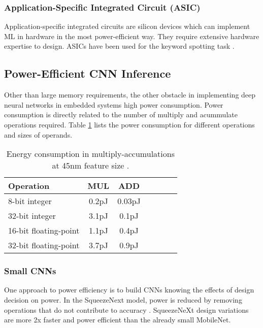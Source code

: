 \subsubsection{Application-Specific Integrated Circuit (ASIC)}

Application-specific integrated circuits are silicon devices which can implement ML in hardware in the most power-efficient way. They require extensive hardware expertise to design. ASICs have been used for the keyword spotting task \cite{Price2018, Liu2019}.


\FloatBarrier

\subsection{Power-Efficient CNN Inference}

Other than large memory requirements, the other obstacle in implementing deep neural networks in embedded systems high power consumption. Power consumption is directly related to the number of multiply and acummulate operations required. Table \ref{power} lists the power consumption for different operations and sizes of operands.


\begin{table}[h]
\renewcommand{\arraystretch}{1}
\small
\centering
\caption{Energy consumption in multiply-accumulations at 45nm feature size \cite{Horowitz2014}.}
\label{power}
\begin{tabular}{lcccccc}
\toprule
\textbf{Operation} & \textbf{MUL} & \textbf{ADD} \\
\midrule
8-bit integer       &0.2pJ  &0.03pJ \\
32-bit integer      &3.1pJ  &0.1pJ \\
16-bit floating-point&1.1pJ &0.4pJ \\
32-bit floating-point&3.7pJ &0.9pJ\\
\bottomrule
\end{tabular}
\end{table}


\subsubsection{Small CNNs}

One approach to power efficiency is to build CNNs knowing the effects of design decision on power.
In the SqueezeNext model, power is reduced by removing operations that do not contribute to accuracy \cite{Gholami2018}. SqueezeNeXt design variations are more 2x faster and power efficient than the already small MobileNet.


